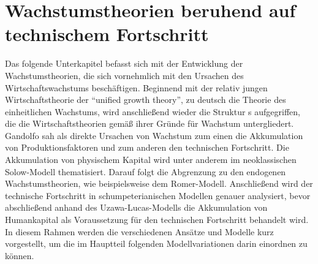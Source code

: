 \section[Wachstumstheorien beruhend auf technischem Fortschritt]{Wachstumstheorien beruhend auf\\ technischem Fortschritt }\label{sec:Wachstumstheorien}
%
Das folgende Unterkapitel befasst sich mit der Entwicklung der Wachstumstheorien, die sich vornehmlich mit den Ursachen des Wirtschaftswachstums beschäftigen. Beginnend mit der relativ jungen Wirtschaftstheorie der "`unified growth theory"', zu deutsch die Theorie des einheitlichen Wachstums, wird anschließend wieder die Struktur \cite{Gandolfo.1998}s aufgegriffen, die die Wirtschaftstheorien gemäß ihrer Gründe für Wachstum untergliedert. Gandolfo sah als direkte Ursachen von Wachstum zum einen die Akkumulation von Produktionsfaktoren und zum anderen den technischen Fortschritt. Die Akkumulation von physischem Kapital wird unter anderem im neoklassischen Solow-Modell thematisiert. Darauf folgt die Abgrenzung zu den endogenen Wachstumstheorien, wie beispielsweise dem Romer-Modell. Anschließend wird der technische Fortschritt in schumpeterianischen Modellen genauer analysiert, bevor abschließend anhand des Uzawa-Lucas-Modells die Akkumulation von Humankapital als Voraussetzung für den technischen Fortschritt behandelt wird. \\
In diesem Rahmen werden die verschiedenen Ansätze und Modelle kurz vorgestellt, um die im Hauptteil folgenden Modellvariationen darin einordnen zu können. 
%
